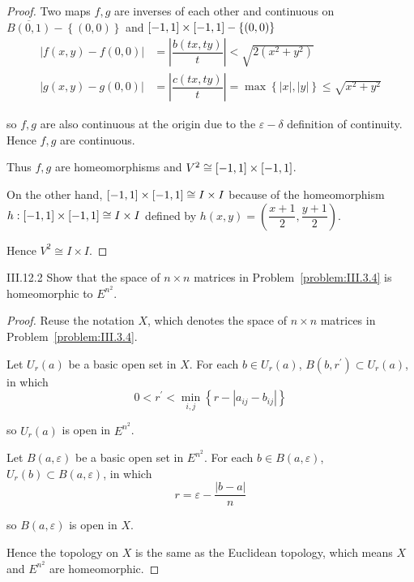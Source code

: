 \begin{proof}
	Two maps \( f, g \) are inverses of each other and continuous on \( \overline{B(0, 1)} - \left\{ (0, 0) \right\} \) and \( \left\lbrack{-1, 1}\right\rbrack \times \left\lbrack{-1, 1}\right\rbrack - \left\{ (0, 0) \right\} \)
	\begingroup
	\allowdisplaybreaks%
	\begin{align*}
		\left\vert f(x, y) - f(0, 0) \right\vert & = \left\vert \dfrac{b(tx, ty)}{t} \right\vert < \sqrt{2(x^{2} + y^{2})}                                                                          \\
		\left\vert g(x, y) - g(0, 0) \right\vert & = \left\vert \dfrac{c(tx, ty)}{t} \right\vert = \max\left\{ \left\vert x \right\vert, \left\vert y \right\vert \right\} \le \sqrt{x^{2} + y^{2}}
	\end{align*}
	\endgroup

	so \( f, g \) are also continuous at the origin due to the \( \varepsilon - \delta \) definition of continuity. Hence \( f, g \) are continuous.

	Thus \( f, g \) are homeomorphisms and \( V^{2} \cong \left\lbrack{-1, 1}\right\rbrack \times \left\lbrack{-1, 1}\right\rbrack \).

	On the other hand, \( \left\lbrack{-1, 1}\right\rbrack \times \left\lbrack{-1, 1}\right\rbrack \cong I \times I \) because of the homeomorphism \( h: \left\lbrack{-1, 1}\right\rbrack \times \left\lbrack{-1, 1}\right\rbrack \cong I \times I \) defined by \( h(x, y) = \left( \dfrac{x + 1}{2}, \dfrac{y + 1}{2} \right) \).

	Hence \( V^{2} \cong I \times I \).
\end{proof}

\begin{problem}{III.12.2}
Show that the space of \( n \times n \) matrices in Problem~\ref{problem:III.3.4} is homeomorphic to \( E^{n^{2}} \).
\end{problem}

\begin{proof}
	Reuse the notation \( X \), which denotes the space of \( n \times n \) matrices in Problem~\ref{problem:III.3.4}.

	Let \( U_{r}(a) \) be a basic open set in \( X \). For each \( b \in U_{r}(a) \), \( B(b, r^{\prime}) \subset U_{r}(a) \), in which
	\[
		0 < r^{\prime} < \min\limits_{i,j}\left\{ r - \left\vert a_{ij} - b_{ij} \right\vert \right\}
	\]

	so \( U_{r}(a) \) is open in \( E^{n^{2}} \).

	Let \( B(a, \varepsilon) \) be a basic open set in \( E^{n^{2}} \). For each \( b \in B(a, \varepsilon) \), \( U_{r}(b) \subset B(a, \varepsilon) \), in which
	\[
		r = \varepsilon - \dfrac{\left\vert b - a \right\vert}{n}
	\]

	so \( B(a, \varepsilon) \) is open in \( X \).

	Hence the topology on \(X\) is the same as the Euclidean topology, which means \( X \) and \( E^{n^{2}} \) are homeomorphic.
\end{proof}

